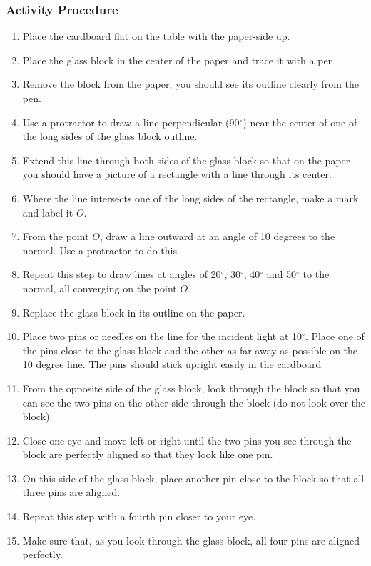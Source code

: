 \subsubsection*{Activity Procedure}
\begin{enumerate}
\item{Place the cardboard flat on the table with the paper-side up.} 
\item{Place the glass block in the center of the paper and trace it with a pen.} 
\item{Remove the block from the paper; you should see its outline clearly from the pen.} 
\item{Use a protractor to draw a line perpendicular (90$^{\circ}$) near the center of one of the long sides of the glass block outline.} 
\item{Extend this line through both sides of the glass block so that on the paper you should have a picture of a rectangle with a line through its center.} 
\item{Where the line intersects one of the long sides of the rectangle, make a mark and label it $O$.}
\item{From the point $O$, draw a line outward at an angle of 10 degrees to the normal. Use a protractor to do this.} 
\item{Repeat this step to draw lines at angles of 20$^{\circ}$, 30$^{\circ}$, 40$^{\circ}$ and 50$^{\circ}$ to the normal, all converging on the point $O$.} 
\item{Replace the glass block in its outline on the paper.} 
\item{Place two pins or needles on the line for the incident light at 10$^{\circ}$. Place one of the pins close to the glass block and the other as far away as possible on the 10 degree line. The pins should stick upright easily in the cardboard}
\item{From the opposite side of the glass block, look through the block so that you can see the two pins on the other side through the block (do not look over the block).} 
\item{Close one eye and move left or right until the two pins you see through the block are perfectly aligned so that they look like one pin.} 
\item{On this side of the glass block, place another pin close to the block so that all three pins are aligned.} 
\item{Repeat this step with a fourth pin closer to your eye.} 
\item{Make sure that, as you look through the glass block, all four pins are aligned perfectly.} 

\end{enumerate}
